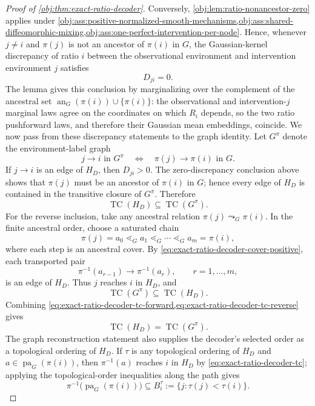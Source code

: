 \begin{proof}[Proof of \cref{obj:thm:exact-ratio-decoder}]
Conversely, \cref{obj:lem:ratio-nonancestor-zero} applies under \cref{obj:ass:positive-normalized-smooth-mechanisms,obj:ass:shared-diffeomorphic-mixing,obj:ass:one-perfect-intervention-per-node}. Hence, whenever \(j\ne i\) and \(\pi(j)\) is not an ancestor of \(\pi(i)\) in \(G\), the Gaussian-kernel discrepancy of ratio \(i\) between the observational environment and intervention environment \(j\) satisfies
\[
D_{ji}=0.
\]
The lemma gives this conclusion by marginalizing over the complement of the ancestral set \(\operatorname{an}_G(\pi(i))\cup\{\pi(i)\}\): the observational and intervention-\(j\) marginal laws agree on the coordinates on which \(R_i\) depends, so the two ratio pushforward laws, and therefore their Gaussian mean embeddings, coincide. %
We now pass from these discrepancy statements to the graph identity. Let \(G^\pi\) denote the environment-label graph
\[
j\to i\text{ in }G^\pi
\quad\Longleftrightarrow\quad
\pi(j)\to\pi(i)\text{ in }G.
\]
If \(j\to i\) is an edge of \(H_D\), then \(D_{ji}>0\). The zero-discrepancy conclusion above shows that \(\pi(j)\) must be an ancestor of \(\pi(i)\) in \(G\); hence every edge of \(H_D\) is contained in the transitive closure of \(G^\pi\). Therefore
\begin{equation}
\operatorname{TC}(H_D)\subseteq\operatorname{TC}(G^\pi).
\label{eq:exact-ratio-decoder-tc-forward}
\end{equation}
For the reverse inclusion, take any ancestral relation \(\pi(j)\leadsto_G\pi(i)\). In the finite ancestral order, choose a saturated chain
\[
\pi(j)=a_0\lessdot_G a_1\lessdot_G\cdots\lessdot_G a_m=\pi(i),
\]
where each step is an ancestral cover. By \cref{eq:exact-ratio-decoder-cover-positive}, each transported pair
\[
\pi^{-1}(a_{r-1})\to\pi^{-1}(a_r),
\qquad r=1,\ldots,m,
\]
is an edge of \(H_D\). Thus \(j\) reaches \(i\) in \(H_D\), and
\begin{equation}
\operatorname{TC}(G^\pi)\subseteq\operatorname{TC}(H_D).
\label{eq:exact-ratio-decoder-tc-reverse}
\end{equation}
Combining \cref{eq:exact-ratio-decoder-tc-forward,eq:exact-ratio-decoder-tc-reverse} gives
\begin{equation}
\operatorname{TC}(H_D)=\operatorname{TC}(G^\pi).
\label{eq:exact-ratio-decoder-tc}
\end{equation}
The graph reconstruction statement also supplies the decoder's selected order as a topological ordering of \(H_D\). If \(\tau\) is any topological ordering of \(H_D\) and \(a\in\operatorname{pa}_G(\pi(i))\), then \(\pi^{-1}(a)\) reaches \(i\) in \(H_D\) by \cref{eq:exact-ratio-decoder-tc}; applying the topological-order inequalities along the path gives
\begin{equation}
\pi^{-1}\!\bigl(\operatorname{pa}_G(\pi(i))\bigr)
\subseteq
B_i^\tau:=\{j:\tau(j)<\tau(i)\}.
\label{eq:exact-ratio-decoder-predecessors}
\end{equation}


\end{proof}
